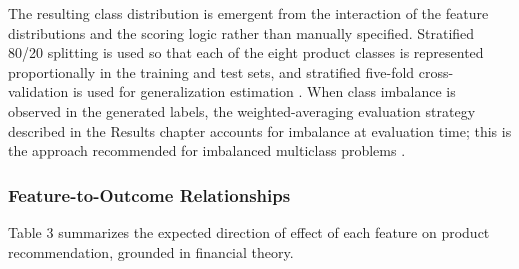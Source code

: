 \documentclass{icsthesis}
\begin{document}
\begin{mainmatter}
					The resulting class distribution is emergent from the interaction of the feature distributions and the scoring logic rather than manually specified. Stratified 80/20 splitting is used so that each of the eight product classes is represented proportionally in the training and test sets, and stratified five-fold cross-validation is used for generalization estimation \cite{ref59}. When class imbalance is observed in the generated labels, the weighted-averaging evaluation strategy described in the Results chapter accounts for imbalance at evaluation time; this is the approach recommended for imbalanced multiclass problems \cite{ref58}.

				\subsubsection{Feature-to-Outcome Relationships}
					Table 3 summarizes the expected direction of effect of each feature on product recommendation, grounded in financial theory.


\end{mainmatter}
\end{document}
